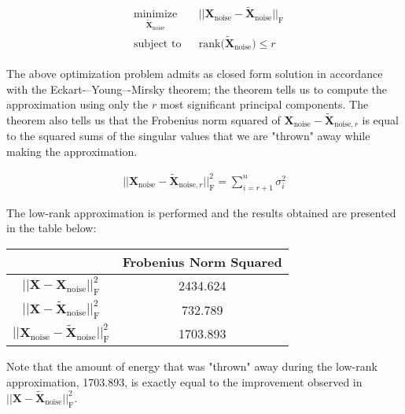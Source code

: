 \begin{align*}
\begin{aligned}
& \underset{\tilde{\textbf{X}}_{\text{noise}}}{\text{minimize}}
& & ||\textbf{X}_{\text{noise}}-\tilde{\textbf{X}}_{\text{noise}}||_{\text{F}}\\
& \text{subject to}
& & \text{rank} \big(\tilde{\textbf{X}}_{\text{noise}}\big) \leq r
\end{aligned}
\end{align*}

\noindent{}The above optimization problem admits as closed form solution in accordance with the Eckart-–Young–-Mirsky theorem; the theorem tells us to compute the approximation using only the $r$ most significant principal components. The theorem also tells us that the Frobenius norm squared of $\textbf{X}_{\text{noise}}-\tilde{\textbf{X}}_{\text{noise}, r}$ is equal to the squared sums of the singular values that we are "thrown" away while making the approximation.

\begin{align*}
||\textbf{X}_{\text{noise}}-\tilde{\textbf{X}}_{\text{noise}, r}||^2_{\text{F}} = \sum_{i=r+1}^n \sigma_i^2
\end{align*}

\noindent{}The low-rank approximation is performed and the results obtained are presented in the table below:

\begin{table}[H]
\tabulinesep=0.9mm
\centering
\begin{tabu}{c|c|}
                                           & Frobenius Norm Squared \\ \hline
{}             			& 2434.624	\\ \hline
{} 				& 732.789	\\ \hline
{}	& 1703.893	\\ \hline
\end{tabu}
\end{table}

\noindent{}Note that the amount of energy that was "thrown" away during the low-rank approximation, 1703.893, is exactly equal to the improvement observed in $||\textbf{X}-\tilde{\textbf{X}}_{\text{noise}}||_{\text{F}}^2$.\\

